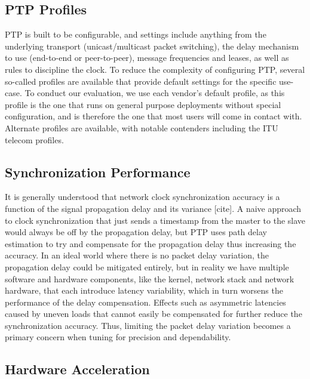 \subsection{PTP Profiles}
PTP is built to be configurable, and settings include anything from the underlying transport (unicast/multicast packet switching), the delay mechanism to use (end-to-end or peer-to-peer), message frequencies and leases, as well as rules to discipline the clock. To reduce the complexity of configuring PTP, several so-called profiles are available that provide default settings for the specific use-case.  To conduct our evaluation, we use each vendor's default profile, as this profile is the one that runs on general purpose deployments without special configuration, and is therefore the one that most users will come in contact with. Alternate profiles are available, with notable contenders including the ITU telecom profiles.

\subsection{Synchronization Performance}
It is generally understood that network clock synchronization accuracy is a function of the signal propagation delay and its variance [cite]. A naive approach to clock synchronization that just sends a timestamp from the master to the slave would always be off by the propagation delay, but PTP uses path delay estimation to try and compensate for the propagation delay thus increasing the accuracy. In an ideal world where there is no packet delay variation, the propagation delay could be mitigated entirely, but in reality we have multiple software and hardware components, like the kernel, network stack and network hardware, that each introduce latency variability, which in turn worsens the performance of the delay compensation. Effects such as asymmetric latencies caused by uneven loads that cannot easily be compensated for further reduce the synchronization accuracy. Thus, limiting the packet delay variation becomes a primary concern when tuning for precision and dependability.

\subsection{Hardware Acceleration}


